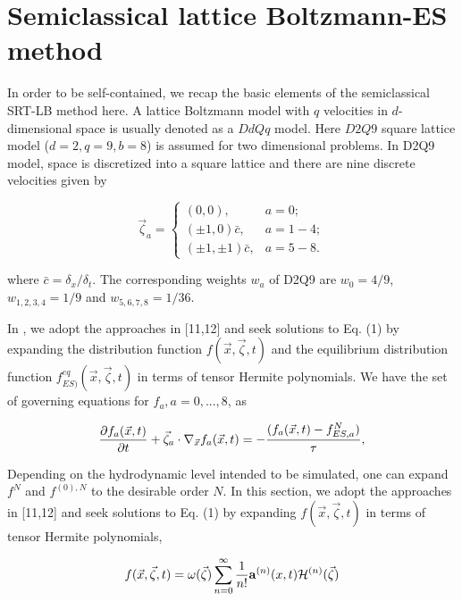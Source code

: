 \documentclass[doublecol]{epl2}
\begin{document}
\section{Semiclassical lattice Boltzmann-ES method}

In order to be self-contained, we recap the basic elements of the semiclassical SRT-LB method here. A lattice Boltzmann model with $q$ velocities in $d$-dimensional space is usually denoted as a $DdQq$ model.   Here $D2Q9$ square lattice model ($d=2, q=9, b=8$) is assumed for two dimensional problems. In D2Q9 model, space is discretized into a square lattice and there are nine discrete velocities given by

\begin{equation}
\vec \zeta_a =
  \begin{cases}
   (0, 0), & a =0; \\
   (\pm 1, 0) \bar{c}, &  a=1-4; \\
   (\pm 1, \pm 1) \bar{c}, & a=5-8.
  \end{cases}
\end{equation}

where $\bar{c} = \delta_x/\delta_t$. The corresponding weights $w_a$ of D2Q9 are $w_0=4/9$, $w_{1,2,3,4}=1/9$ and $w_{5,6,7,8}=1/36$.

In \cite{Yang2009}, we adopt the approaches in [11,12] and seek solutions to Eq. (1) by expanding the distribution function $f(\vec x,\vec \zeta, t)$ and the equilibrium distribution function $f^{eq}_{ES)}(\vec x, \vec\zeta, t)$ in terms of tensor Hermite polynomials. We have the set of governing equations for $f_a, a=0, ..., 8$, as

\begin{align}
{\partial f_a (\vec x, t) \over \partial t} + \vec \zeta_a \cdot
\nabla_{\vec x} f_a( \vec x, t) =  -{(f_a(\vec x, t) - f^{N}_{ES,a}) \over \tau},
\end{align}

Depending on the hydrodynamic level intended to be simulated, one can expand $f^N$ and $f^{(0),N}$ to the desirable order $N$. In this section, we adopt the approaches in [11,12] and seek solutions to Eq. (1) by expanding $f(\vec x,\vec\zeta ,t)$ in terms of tensor Hermite polynomials,

\begin{align}
 f(\vec x,\vec\zeta ,t) =\omega (\vec\zeta )\sum _{n=0}^{\infty}
\frac{1}{n!} {\bf a}^{(n)}(x,t) {{\mathcal H}}^{(n)} (\vec\zeta )
\end{align}
\end{document}
